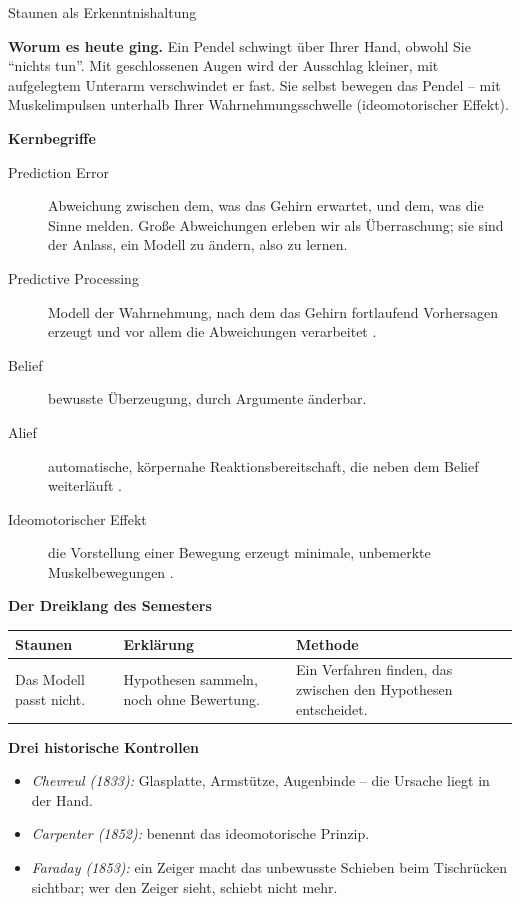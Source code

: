 \begin{handout}{Staunen als Erkenntnishaltung}

\textbf{Worum es heute ging.} Ein Pendel schwingt über Ihrer Hand, obwohl
Sie \enquote{nichts tun}. Mit geschlossenen Augen wird der Ausschlag
kleiner, mit aufgelegtem Unterarm verschwindet er fast. Sie selbst bewegen
das Pendel -- mit Muskelimpulsen unterhalb Ihrer Wahrnehmungsschwelle
(ideomotorischer Effekt).

\textbf{Kernbegriffe}
\begin{description}
  \item[Prediction Error] Abweichung zwischen dem, was das Gehirn erwartet,
    und dem, was die Sinne melden. Große Abweichungen erleben wir als
    Überraschung; sie sind der Anlass, ein Modell zu ändern, also zu lernen.
  \item[Predictive Processing] Modell der Wahrnehmung, nach dem das Gehirn
    fortlaufend Vorhersagen erzeugt und vor allem die Abweichungen
    verarbeitet \parencite{clark2016}.
  \item[Belief] bewusste Überzeugung, durch Argumente änderbar.
  \item[Alief] automatische, körpernahe Reaktionsbereitschaft, die neben
    dem Belief weiterläuft \parencite{gendler2008}.
  \item[Ideomotorischer Effekt] die Vorstellung einer Bewegung erzeugt
    minimale, unbemerkte Muskelbewegungen \parencite{carpenter1852}.
\end{description}

\textbf{Der Dreiklang des Semesters}

\begin{center}
\begin{tabular}{p{}p{}p{}}
\toprule
\textbf{Staunen} & \textbf{Erklärung} & \textbf{Methode} \\
\midrule
Das Modell passt nicht. & Hypothesen sammeln, noch ohne Bewertung. & Ein Verfahren finden, das zwischen den Hypothesen entscheidet. \\
\bottomrule
\end{tabular}
\end{center}

\textbf{Drei historische Kontrollen}
\begin{itemize}
  \item \emph{Chevreul (1833):} Glasplatte, Armstütze, Augenbinde -- die
    Ursache liegt in der Hand.
  \item \emph{Carpenter (1852):} benennt das ideomotorische Prinzip.
  \item \emph{Faraday (1853):} ein Zeiger macht das unbewusste Schieben beim
    Tischrücken sichtbar; wer den Zeiger sieht, schiebt nicht mehr.
\end{itemize}


\end{handout}
